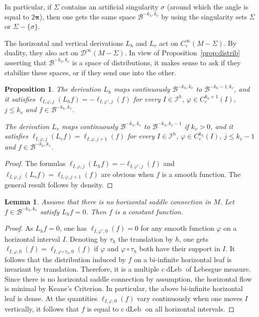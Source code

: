 \documentclass[10pt]{amsart}
\newcommand{\boI}{\mathcal{I}}
\newcommand{\boB}{\mathcal{B}}
\newcommand{\boD}{\mathcal{D}}
\newcommand{\bpi}{\boldsymbol{\pi}}
\DeclareMathOperator{\dLeb}{dLeb}
\let\phi\varphi
\newtheorem{prop}[thm]{Proposition}
\newtheorem{lem}[thm]{Lemma}
\theoremstyle{definition}
\numberwithin{equation}{section}
\begin{document}
In particular, if $\Sigma$ contains an artificial singularity $\sigma$ (\ie around which the angle is equal to $2\bpi$), then one gets the same space
$\boB^{-k_h, k_v}$ by using the singularity sets $\Sigma$ or $\Sigma
-\{\sigma\}$.

The horizontal and vertical derivations $L_h$ and $L_v$ act on
$C^\infty_c(M-\Sigma)$. By duality, they also act on $\boD^\infty(M-\Sigma)$.
In view of Proposition~\ref{prop:distrib} asserting that $\boB^{-k_h, k_v}$ is
a space of distributions, it makes sense to ask if they
stabilize these spaces, or if they send one into the other.

\begin{prop}
\label{prop:Lh_Lv_action} The derivation $L_h$ maps continuously $\boB^{-k_h,
k_v}$ to $\boB^{-k_h-1, k_v}$, and it satisfies $\ell_{I,\phi, j}(L_h f) =
-\ell_{I,\phi', j}(f)$ for every $I \in \boI^h$, $\phi \in C^{k_h+1}_c(I)$,
$j \leq k_v$ and $f \in \boB^{-k_h, k_v}$.

The derivation $L_v$ maps continuously $\boB^{-k_h, k_v}$ to $\boB^{-k_h,
k_v-1}$ if $k_v>0$, and it satisfies $\ell_{I,\phi, j}(L_v f) = \ell_{I,
\phi, j+1}(f)$ for every $I \in \boI^h$, $\phi \in C^{k_h}_c(I)$, $j \leq
k_v-1$ and $f \in \boB^{-k_h, k_v}$.
\end{prop}
\begin{proof}
The formulas $\ell_{I,\phi, j}(L_h f) = -\ell_{I,\phi', j}(f)$ and
$\ell_{I,\phi, j}(L_v f) = \ell_{I, \phi, j+1}(f)$ are obvious when $f$ is a
smooth function. The general result follows by density.
\end{proof}

\begin{lem}
\label{lem:Lh_0} Assume that there is no horizontal saddle connection in $M$.
Let \hbox{$f\in \boB^{-k_h, k_v}$} satisfy $L_h f = 0$. Then $f$ is a constant
function.
\end{lem}
\begin{proof}
As $L_h f = 0$, one has $\ell_{I,\phi', 0}(f) = 0$ for any smooth function
$\phi$ on a horizontal interval $I$. Denoting by $\tau_h$ the translation by
$h$, one gets $\ell_{I,\phi, 0}(f) = \ell_{I,\phi \circ \tau_h, 0}(f)$ if
$\phi$ and $\phi \circ \tau_h$ both have their support in $I$. It follows
that the distribution induced by $f$ on a bi-infinite horizontal leaf is
invariant by translation. Therefore, it is a multiple $c\dLeb$ of Lebesgue
measure. Since there is no horizontal saddle connection by assumption, the
horizontal flow is minimal by Keane's Criterion. In particular, the above
bi-infinite horizontal leaf is dense. At the quantities $\ell_{I,\phi, 0}(f)$
vary continuously when one moves $I$ vertically, it follows that $f$ is equal
to $c\dLeb$ on all horizontal intervals.
\end{proof}
\end{document}
